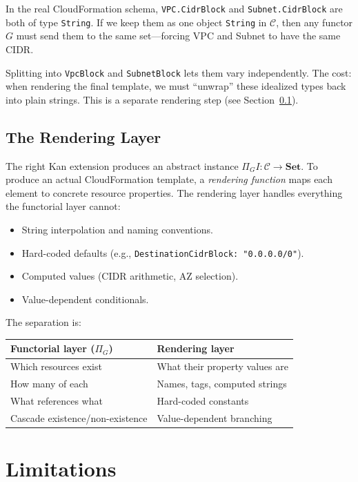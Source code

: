 \documentclass[11pt,a4paper]{article}
\theoremstyle{definition}
\theoremstyle{plain}
\newcommand{\Set}{\mathbf{Set}}
\begin{document}
In the real CloudFormation schema, \texttt{VPC.CidrBlock} and \texttt{Subnet.CidrBlock} are both of type \texttt{String}. If we keep them as one object \texttt{String} in $\mathcal{C}$, then any functor $G$ must send them to the same set---forcing VPC and Subnet to have the same CIDR.

Splitting into \texttt{VpcBlock} and \texttt{SubnetBlock} lets them vary independently. The cost: when rendering the final template, we must ``unwrap'' these idealized types back into plain strings. This is a separate rendering step (see Section~\ref{sec:rendering}).

\subsection{The Rendering Layer}
\label{sec:rendering}

The right Kan extension produces an abstract instance $\Pi_G I \colon \mathcal{C} \to \Set$. To produce an actual CloudFormation template, a \emph{rendering function} maps each element to concrete resource properties. The rendering layer handles everything the functorial layer cannot:
\begin{itemize}
  \item String interpolation and naming conventions.
  \item Hard-coded defaults (e.g., \texttt{DestinationCidrBlock: "0.0.0.0/0"}).
  \item Computed values (CIDR arithmetic, AZ selection).
  \item Value-dependent conditionals.
\end{itemize}

The separation is:
\begin{center}
\begin{tabular}{ll}
\toprule
\textbf{Functorial layer ($\Pi_G$)} & \textbf{Rendering layer} \\
\midrule
Which resources exist & What their property values are \\
How many of each & Names, tags, computed strings \\
What references what & Hard-coded constants \\
Cascade existence/non-existence & Value-dependent branching \\
\bottomrule
\end{tabular}
\end{center}

\section{Limitations}
\end{document}
